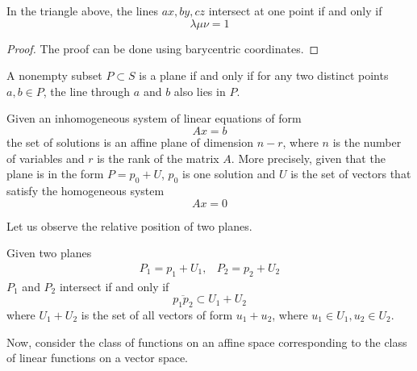 \documentclass{article}
\begin{document}
    \begin{corollary}
      In the triangle above, the lines $ax, by, cz$ intersect at one point if and only if 
      \begin{equation}
        \lambda \mu \nu = 1
      \end{equation}
    \end{corollary}
    \begin{proof}
      The proof can be done using barycentric coordinates. 
    \end{proof}

    \begin{theorem}
      A nonempty subset $P \subset S$ is a plane if and only if for any two distinct points $a, b \in P$, the line through $a$ and $b$ also lies in $P$. 
    \end{theorem}

    \begin{theorem}
      Given an inhomogeneous system of linear equations of form 
      \begin{equation}
        A x = b
      \end{equation}
      the set of solutions is an affine plane of dimension $n-r$, where $n$ is the number of variables and $r$ is the rank of the matrix $A$. More precisely, given that the plane is in the form $P = p_0 + U$, $p_0$ is one solution and $U$ is the set of vectors that satisfy the homogeneous system
      \begin{equation}
        Ax = 0
      \end{equation}
    \end{theorem}

    Let us observe the relative position of two planes. 

    \begin{theorem}
      Given two planes 
      \begin{align*}
        P_1 = p_1 + U_1, & P_2 = p_2 + U_2
      \end{align*}
      $P_1$ and $P_2$ intersect if and only if 
      \begin{equation}
        \overline{p_1 p_2} \subset U_1 + U_2
      \end{equation}
      where $U_1 + U_2$ is the set of all vectors of form $u_1 + u_2$, where $u_1 \in U_1, u_2 \in U_2$. 
    \end{theorem}

    Now, consider the class of functions on an affine space corresponding to the class of linear functions on a vector space. 
\end{document}
